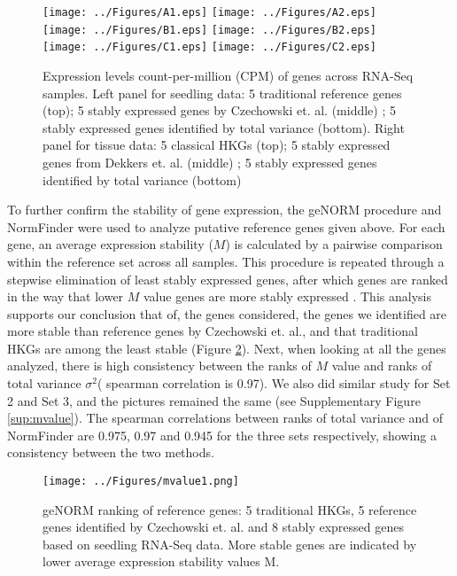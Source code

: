 \documentclass[11pt, a4paper]{article}
\begin{document}
 \begin{figure}[H]
\begin{center}
\texttt{[image: ../Figures/A1.eps]}
\texttt{[image: ../Figures/A2.eps]}
\texttt{[image: ../Figures/B1.eps]}
\texttt{[image: ../Figures/B2.eps]}
\texttt{[image: ../Figures/C1.eps]}
\texttt{[image: ../Figures/C2.eps]}

\caption{{\small{\label{expressinlevel} Expression levels  count-per-million (CPM) of genes across RNA-Seq samples. Left panel for seedling data:  5 traditional reference genes (top)};  5 stably expressed genes by Czechowski et. al. (middle) ; 5 stably expressed genes identified by total variance (bottom). Right panel for tissue data: 5 classical HKGs (top);  5 stably expressed genes from Dekkers et. al. (middle) ; 5 stably expressed genes identified by total variance (bottom) }}
\end{center}
\end{figure} 

To further confirm the stability of gene expression, the geNORM \citep{vandesompele2002accurate} procedure and %
NormFinder \citep{andersen2004normalization} 
 were used to analyze putative reference genes given above.  For each gene, an average expression stability ($M$) is calculated by a pairwise comparison within the reference set across all samples. This procedure is repeated through a stepwise elimination of least stably expressed genes, after which genes are ranked in the way that lower $M$ value genes are more stably expressed \citep{vandesompele2002accurate}. This analysis supports our conclusion that of, the genes considered, the genes we identified are more stable than reference genes by Czechowski et. al., and that traditional HKGs are among the least stable (Figure \ref{mvalue}). Next, when looking at all the genes analyzed, there is high consistency between the ranks of $M$ value and ranks of total variance $\sigma^2$( spearman correlation is 0.97). We also did similar study for Set 2 and Set 3, and the pictures remained the same (see Supplementary Figure \ref{sup:mvalue}). The spearman correlations  between ranks of total variance and of NormFinder are 0.975, 0.97 and 0.945 for the three sets respectively, showing a consistency between the two methods. 

 \begin{figure}[h!]
\begin{center}
\texttt{[image: ../Figures/mvalue1.png]}
\caption{\label{mvalue} geNORM ranking of reference genes: 5 traditional HKGs, 5 reference genes identified by Czechowski et. al. and 8 stably expressed genes based on seedling RNA-Seq data.  More stable genes are indicated by lower average expression stability values M.}
\end{center}
\end{figure}
\end{document}
